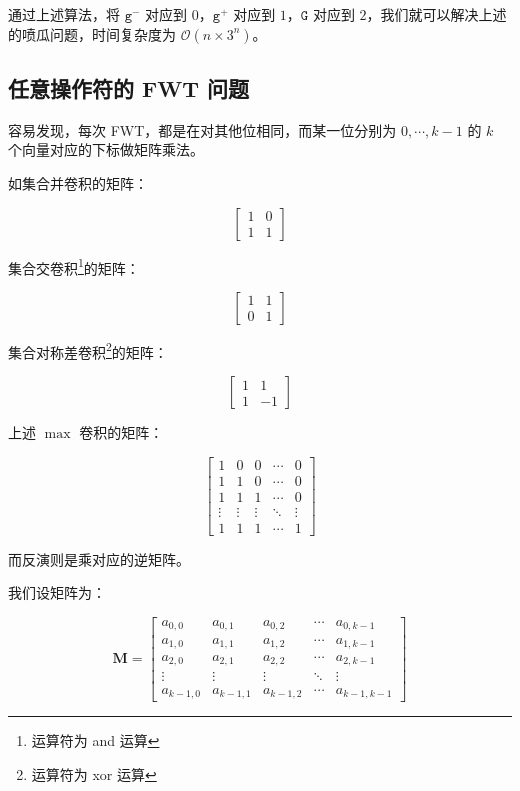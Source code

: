 \documentclass{article}
\begin{document}
通过上述算法，将 $\texttt{g}^-$ 对应到 $0$，$\texttt{g}^+$ 对应到 $1$，$\texttt{G}$ 对应到 $2$，我们就可以解决上述的喷瓜问题，时间复杂度为 $\mathcal O(n \times 3^n)$。

\subsection{任意操作符的 FWT 问题}

容易发现，每次 FWT，都是在对其他位相同，而某一位分别为 $0, \cdots ,k-1$ 的 $k$ 个向量对应的下标做矩阵乘法。

如集合并卷积的矩阵：

$$\begin{bmatrix} 1 & 0 \\ 1 & 1 \end{bmatrix}$$

集合交卷积\footnote{运算符为 and 运算}的矩阵：

$$\begin{bmatrix} 1 & 1 \\ 0 & 1 \end{bmatrix}$$

集合对称差卷积\footnote{运算符为 xor 运算}的矩阵：

$$\begin{bmatrix} 1 & 1 \\ 1 & -1 \end{bmatrix}$$

上述 $\max$ 卷积的矩阵：

$$\begin{bmatrix} 1& 0 & 0& \cdots & 0\\ 1& 1& 0& \cdots & 0\\ 1& 1 & 1& \cdots & 0\\ \vdots& \vdots& \vdots& \ddots& \vdots\\ 1& 1& 1 & \cdots & 1 \end{bmatrix}$$

而反演则是乘对应的逆矩阵。

我们设矩阵为：

$$\mathbf{M}=\begin{bmatrix} a_{0,0}&  a_{0,1} &  a_{0,2}& \cdots &  a_{0,k-1}\\  a_{1,0}&  a_{1,1}&  a_{1,2}& \cdots &  a_{1,k-1}\\  a_{2,0}&  a_{2,1} &  a_{2,2}& \cdots &  a_{2,k-1}\\ \vdots& \vdots& \vdots& \ddots& \vdots\\  a_{k-1,0}&  a_{k-1,1}&  a_{k-1,2} & \cdots &  a_{k-1,k-1} \end{bmatrix}$$
\end{document}
